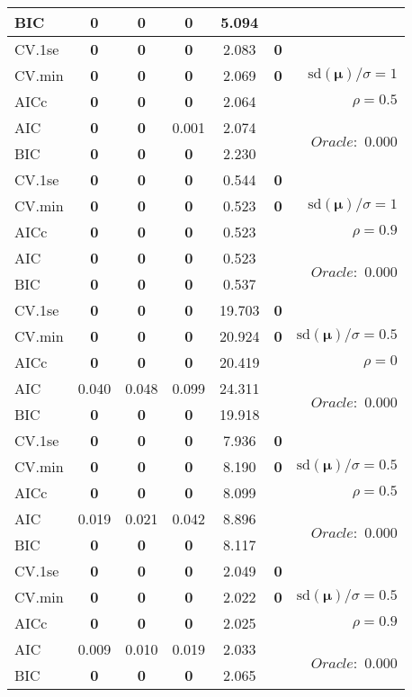 \begin{table}
\begin{center}
\begin{tabular}{l*{5}{c}|r}
BIC & {\bf 0} & {\bf 0} & {\bf 0} & 5.094 & &  \\
 \hline 
CV.1se & {\bf 0} & {\bf 0} & {\bf 0} & 2.083 & {\bf 0} & \\
CV.min & {\bf 0} & {\bf 0} & {\bf 0} & 2.069 & {\bf 0} &  $\mathrm{sd}(\mathbf{\mu})/\sigma=1$ \\
AICc & {\bf 0} & {\bf 0} & {\bf 0} & 2.064 & & $\rho=0.5$ \\
AIC & {\bf 0} & {\bf 0} & 0.001 & 2.074 & &  \multirow{2}{*}{$Oracle: $ 0.000} \\
BIC & {\bf 0} & {\bf 0} & {\bf 0} & 2.230 & &  \\
 \hline 
CV.1se & {\bf 0} & {\bf 0} & {\bf 0} & 0.544 & {\bf 0} & \\
CV.min & {\bf 0} & {\bf 0} & {\bf 0} & 0.523 & {\bf 0} &  $\mathrm{sd}(\mathbf{\mu})/\sigma=1$ \\
AICc & {\bf 0} & {\bf 0} & {\bf 0} & 0.523 & & $\rho=0.9$ \\
AIC & {\bf 0} & {\bf 0} & {\bf 0} & 0.523 & &  \multirow{2}{*}{$Oracle: $ 0.000} \\
BIC & {\bf 0} & {\bf 0} & {\bf 0} & 0.537 & &  \\
 \hline 
CV.1se & {\bf 0} & {\bf 0} & {\bf 0} & 19.703 & {\bf 0} & \\
CV.min & {\bf 0} & {\bf 0} & {\bf 0} & 20.924 & {\bf 0} &  $\mathrm{sd}(\mathbf{\mu})/\sigma=0.5$ \\
AICc & {\bf 0} & {\bf 0} & {\bf 0} & 20.419 & & $\rho=0$ \\
AIC & 0.040 & 0.048 & 0.099 & 24.311 & &  \multirow{2}{*}{$Oracle: $ 0.000} \\
BIC & {\bf 0} & {\bf 0} & {\bf 0} & 19.918 & &  \\
 \hline 
CV.1se & {\bf 0} & {\bf 0} & {\bf 0} & 7.936 & {\bf 0} & \\
CV.min & {\bf 0} & {\bf 0} & {\bf 0} & 8.190 & {\bf 0} &  $\mathrm{sd}(\mathbf{\mu})/\sigma=0.5$ \\
AICc & {\bf 0} & {\bf 0} & {\bf 0} & 8.099 & & $\rho=0.5$ \\
AIC & 0.019 & 0.021 & 0.042 & 8.896 & &  \multirow{2}{*}{$Oracle: $ 0.000} \\
BIC & {\bf 0} & {\bf 0} & {\bf 0} & 8.117 & &  \\
 \hline 
CV.1se & {\bf 0} & {\bf 0} & {\bf 0} & 2.049 & {\bf 0} & \\
CV.min & {\bf 0} & {\bf 0} & {\bf 0} & 2.022 & {\bf 0} &  $\mathrm{sd}(\mathbf{\mu})/\sigma=0.5$ \\
AICc & {\bf 0} & {\bf 0} & {\bf 0} & 2.025 & & $\rho=0.9$ \\
AIC & 0.009 & 0.010 & 0.019 & 2.033 & &  \multirow{2}{*}{$Oracle: $ 0.000} \\
BIC & {\bf 0} & {\bf 0} & {\bf 0} & 2.065 & &  \\
 \hline 
\end{tabular}
\end{center}
\vspace{-1cm}
\end{table}




